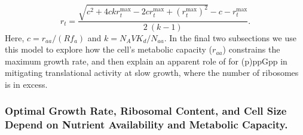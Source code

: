 \begin{equation}
r_t = \frac{\sqrt{c^2 + 4 c k r_{t}^{\text{max}} - 2 c r_{t}^{\text{max}} + (r_{t}^{\text{max}})^2} - c - r_{t}^{\text{max}}}{2 \ (k-1)}.
\label{eq:rt_final}
\end{equation}
Here, $c = r_{aa}/(R f_a)$ and $k = N_A V K_d / N_{aa}$. In the final two
subsections we use this model to explore how the cell's metabolic capacity
($r_{aa}$) constrains the maximum growth rate, and then explain an apparent role
of for (p)ppGpp in mitigating translational activity at slow growth, where the
number of ribosomes is in excess.

\subsubsection{Optimal Growth Rate, Ribosomal Content, and Cell Size Depend on Nutrient
Availability and Metabolic Capacity.}

